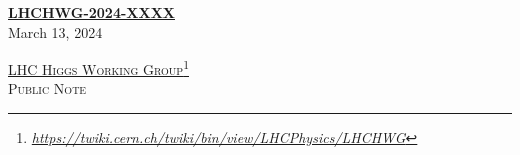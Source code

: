 \documentclass[11pt]{article}
\begin{document}
\hypersetup{pageanchor=false}

\thispagestyle{empty}
 \begin{titlepage}

	\begin{flushright}
	  {\large
            \textbf{\href{https://https://cds.cern.ch/record/XXXXX}{LHCHWG-2024-XXXX}}} \\[0.5cm]	
		{\large 	\textrm{March 13, 2024}} \\[2.0cm]
	\end{flushright}

	\begin{center}

	\textsc{\Large 	\href{https://twiki.cern.ch/twiki/bin/view/LHCPhysics/LHCHWG}{LHC Higgs Working Group}\footnote{\href{https://twiki.cern.ch/twiki/bin/view/LHCPhysics/LHCHWG}{\sl https://twiki.cern.ch/twiki/bin/view/LHCPhysics/LHCHWG}}} \\[0.5cm]
	\textsc{\Large 	Public Note} \\[1.5cm]
	

\end{center}
\end{titlepage}
\end{document}
